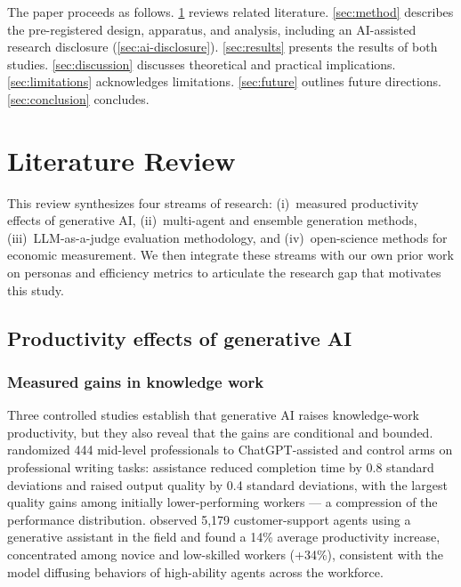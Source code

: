 \documentclass[12pt,a4paper]{article}
\begin{document}
The paper proceeds as follows. \cref{sec:lit} reviews related literature.
\cref{sec:method} describes the pre-registered design, apparatus, and analysis,
including an AI-assisted research disclosure (\cref{sec:ai-disclosure}).
\cref{sec:results} presents the results of both studies. \cref{sec:discussion}
discusses theoretical and practical implications. \cref{sec:limitations}
acknowledges limitations. \cref{sec:future} outlines future directions.
\cref{sec:conclusion} concludes.

\section{Literature Review}\label{sec:lit}

This review synthesizes four streams of research: (i)~measured productivity
effects of generative AI, (ii)~multi-agent and ensemble generation methods,
(iii)~LLM-as-a-judge evaluation methodology, and (iv)~open-science methods for
economic measurement. We then integrate these streams with our own prior work on
personas and efficiency metrics to articulate the research gap that motivates
this study.

\subsection{Productivity effects of generative AI}

\subsubsection{Measured gains in knowledge work}

Three controlled studies establish that generative AI raises knowledge-work
productivity, but they also reveal that the gains are conditional and bounded.
\citet{NoyZhang2023} randomized 444 mid-level professionals to ChatGPT-assisted
and control arms on professional writing tasks: assistance reduced completion
time by 0.8 standard deviations and raised output quality by 0.4 standard
deviations, with the largest quality gains among initially lower-performing
workers --- a compression of the performance distribution.
\citet{BrynjolfssonLiRaymond2023} observed 5{,}179 customer-support agents
using a generative assistant in the field and found a 14\% average productivity
increase, concentrated among novice and low-skilled workers (+34\%), consistent
with the model diffusing behaviors of high-ability agents across the workforce.
\end{document}
